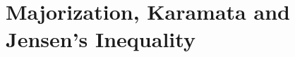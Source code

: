 \documentclass{subfile}
\begin{document}
	\section{Majorization, Karamata and Jensen's Inequality}\label{sec:mazorization}
\end{document}
